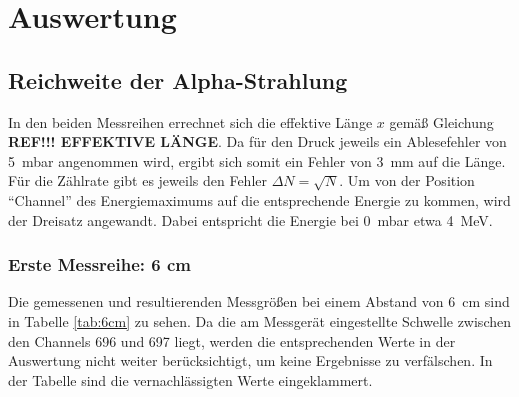 \section{Auswertung}



\subsection{Reichweite der Alpha-Strahlung}
In den beiden Messreihen errechnet sich die effektive Länge $x$ gemäß Gleichung \textbf{REF!!! EFFEKTIVE LÄNGE}.
Da für den Druck jeweils ein Ablesefehler von \qty[]{5}{\milli\bar} angenommen wird, ergibt sich somit ein Fehler von 
\qty[]{3}{\mm} auf die Länge.
Für die Zählrate gibt es jeweils den Fehler $\Delta N = \sqrt{N}$.
Um von der Position \enquote{Channel} des Energiemaximums auf die entsprechende Energie zu kommen, wird der Dreisatz angewandt.
Dabei entspricht die Energie bei \qty{0}{\milli\bar} etwa \qty[]{4}{\mega\electronvolt}. 


\subsubsection[]{Erste Messreihe: 6 cm}
Die gemessenen und resultierenden Messgrößen bei einem Abstand von \qty[]{6}{\cm} sind in Tabelle \ref{tab:6cm} zu sehen.
Da die am Messgerät eingestellte Schwelle zwischen den Channels 696 und 697 liegt, werden die entsprechenden Werte
in der Auswertung nicht weiter berücksichtigt, um keine Ergebnisse zu verfälschen.
In der Tabelle sind die vernachlässigten Werte eingeklammert.

